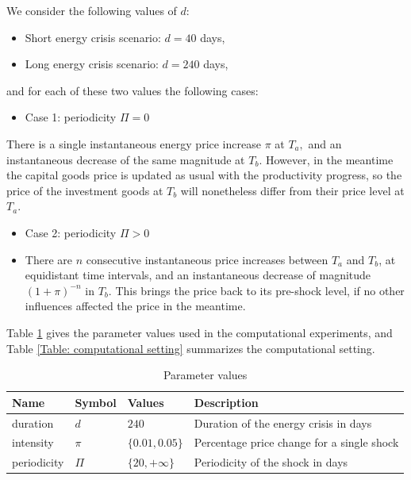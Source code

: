 We consider the following values of $d$:
\begin{itemize}
\item Short energy crisis scenario: $d=40$ days,
\item Long energy crisis scenario: $d=240$ days,
\end{itemize}
and for each of these two values the following cases:

\begin{itemize}
\item Case 1: periodicity $\Pi=0$
\end{itemize}

There is a single instantaneous energy price increase $\pi$ at $T_{a},$ and
an instantaneous decrease of the same magnitude at $T_{b}.$ However, in the
meantime the capital goods price is updated as usual with the productivity
progress, so the price of the investment goods at $T_{b}$ will nonetheless
differ from their price level at $T_{a}$.

\begin{itemize}
\item Case 2: periodicity $\Pi>0$

\item There are $n$ consecutive instantaneous price increases between $T_{a}$
and $T_{b}$, at equidistant time intervals, and an instantaneous decrease
of magnitude $(1+\pi)^{-n}$ in $T_{b}$. This brings the price back to its pre-shock level, 
if no other influences affected the price in the meantime.
\end{itemize}

Table \ref{Table: parameter settings} gives the parameter values used in the
computational experiments, and Table \ref{Table: computational setting} summarizes the computational
setting.

\begin{table}[tbp]
\caption{Parameter values}
\centering
\begin{tabular}{llll}
\hline\hline
Name & Symbol & Values & Description \\ \hline
duration & $d$ & $240$ & Duration of the energy crisis in days \\
intensity & $\pi$ & $\{0.01, 0.05\}$ & Percentage price change for a
single shock \\
periodicity & $\Pi$ & $\{20, +\infty\}$ & Periodicity of the shock in days%
\end{tabular}%
\label{Table: parameter settings}
\end{table}

